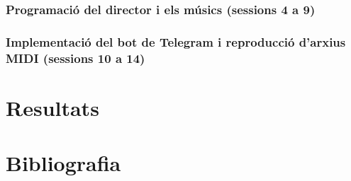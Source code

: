 \documentclass[a4paper]{article}
\begin{document}
\subsubsection{Programació del director i els músics (sessions 4 a 9)}

\subsubsection{Implementació del bot de Telegram i reproducció d'arxius MIDI (sessions 10 a 14)}

\section{Resultats}

\section{Bibliografia}
\end{document}

